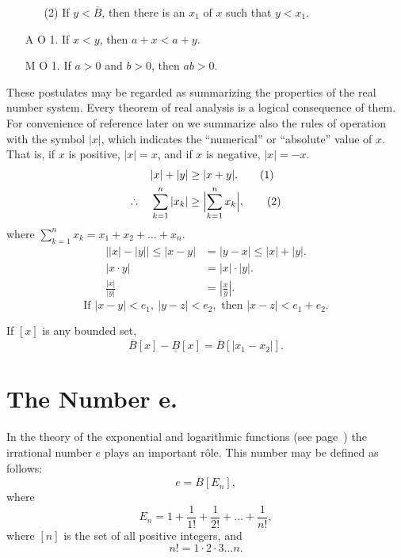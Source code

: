 \documentclass[a4paper,12pt]{book}[2004/02/16]
\providecommand{\leqq}{\leq}
\providecommand{\geqq}{\geq}
\providecommand{\therefore}{\mathrel{{.}\kern-.05em\raise.40em\hbox{.}\kern-.05em{.}}}
\providecommand{\hypertarget}[2]{#2}
\theoremstyle{ilemma}
\theoremstyle{itheorem}
\theoremstyle{iother}
\theoremstyle{icorollary}
\theoremstyle{numcorollary}
\theoremstyle{idefinition}
\begin{document}
\begin{itemize}
\begin{enumerate}
\item[(2)] If $y < \overline{B}$, then there is an $x_1$ of $x$ such
that $y<x_1$.
\end{enumerate}
\item[A O 1.] If $x<y$, then $a+x<a+y$.

\item[M O 1.] If $a>0$ and $b>0$, then $ab>0$.
\end{itemize}

These postulates may be regarded as summarizing the properties of the
real number system. Every theorem of real analysis is a logical
consequence of them. For convenience of reference later on we
summarize also the rules of operation with the symbol $|x|$, which
indicates the ``numerical'' or ``absolute'' value of $x$. That is, if
$x$ is positive, $|x| = x$, and if $x$ is negative, $|x| =-x$.
\begin{align*}
  |x| + |y| &\geqq|x+y|.
\tag{1}\\
  \therefore\quad\sum_{k=1}^n|x_k| &\geqq
  \Bigl|\sum_{k=1}^n x_k \Bigr|,
\tag{2}
\end{align*}
where $\sum_{k=1}^n x_k = x_1 + x_2 + \ldots + x_n$.
\begin{align*}
  \bigl| |x|-|y| \bigr|\leqq|x-y|
  &= |y-x|\leqq|x| +|y|.
\tag{3}\\
  |x\cdot y| &= |x| \cdot|y|.
\tag{4}\\
  \frac{|x|}{|y|} &= \left|\frac xy\right|.
\tag{5}
\end{align*}
\[\text{If }
  |x-y| < e_1,\
  |y-z| < e_2, \text{ then }
  |x-z| < e_1 + e_2.
\tag{6}
\]

If $[x]$ is any bounded set,
\[
  \overline{B}[x]-\underline{B}[x]
  = \overline{B}[|x_1-x_2 |].
\tag{7}
\]

\section[The Number $e$.]{The Number $\boldsymbol e$.}\hypertarget{chIsec6}{}%

In the theory of the exponential and logarithmic functions (see
page~\pageref{s4p97}) the irrational number $e$ plays an important
r\^ole.  This number may be defined as follows:
\hypertarget{eq1p16}{\[
  e = \overline{B}[E_n],
\tag{1}
\]}
where
\[
  E_n = 1+\frac{1}{1!}+\frac{1}{2!}+\ldots +\frac{1}{n!},
\]
where $[n]$ is the set of all positive integers, and
\[
  n!= 1 \cdot 2 \cdot 3 \ldots n.
\]
\end{document}
